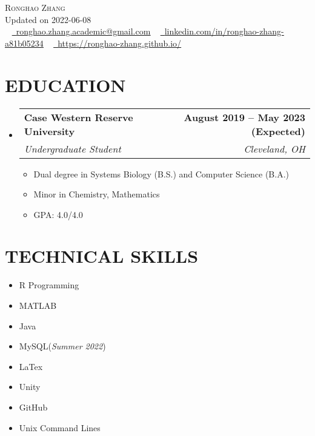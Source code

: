 \documentclass[letterpaper,11pt]{article}
\makeatletter
\newcommand{\resumeItem}[1]{
	\item\small{
		{#1 \vspace{0pt}}
	}
}
\newcommand{\resumeSubheading}[4]{
	\vspace{-2pt}\item
	\begin{tabular*}{1.0\textwidth}[t]{l@{\extracolsep{\fill}}r}
		\textbf{#1} & \textbf{\small #2} \\
		\textit{\small#3} & \textit{\small #4} \\
	\end{tabular*}\vspace{-4pt}
}
\newcommand{\resumeSubHeadingListStart}{\begin{itemize}[leftmargin=0.0in, label={}]}
\newcommand{\resumeSubHeadingListEnd}{\end{itemize}}
\newcommand{\resumeItemListStart}{\begin{itemize}}
\newcommand{\resumeItemListEnd}{\end{itemize}\vspace{-5pt}}
\makeatother
\begin{document}
	
	\begin{center}
		{\Huge \scshape Ronghao Zhang} 
		\\ \vspace{5pt}
		Updated on 2022-06-08 
		\\ \vspace{5pt}
		\small \raisebox{-0.1\height} ~ 
		\href{mailto:x@gmail.com}{\raisebox{-0.2\height}\faEnvelope\          \underline{ronghao.zhang.academic@gmail.com}} ~ 
		\href{https://linkedin.com/in//}{\raisebox{-0.2\height}\faLinkedin\     \underline{linkedin.com/in/ronghao-zhang-a81b05234}}  ~
		\href{https://ronghao-zhang.github.io/}{\raisebox{-0.2\height}\faGithub\ \underline{https://ronghao-zhang.github.io/}}
		\vspace{1pt}
	\end{center}
	
	\section{EDUCATION}
	\resumeSubHeadingListStart
	\resumeSubheading
	{Case Western Reserve University}{August 2019 -- May 2023 (Expected)}
	{Undergraduate Student}{Cleveland, OH}
	\resumeItemListStart
	\resumeItem{Dual degree in Systems Biology (B.S.) and Computer Science (B.A.)}
	\resumeItem{Minor in Chemistry, Mathematics}
	\resumeItem{GPA: 4.0/4.0}
	\resumeItemListEnd
	\resumeSubHeadingListEnd
	
	\section{TECHNICAL SKILLS}
	\begin{multicols}{4}
		\begin{itemize}[itemsep=-2pt, parsep=5pt]
			\item\small R Programming
			\item       MATLAB 
			\item       Java
			\item       MySQL(\textit{Summer 2022})
			\item       LaTex
			\item       Unity
			\item       GitHub
			\item       Unix Command Lines
			
		\end{itemize}
	\end{multicols}
	\vspace*{2.0\multicolsep}
	\vspace{7pt}
	
\end{document}
